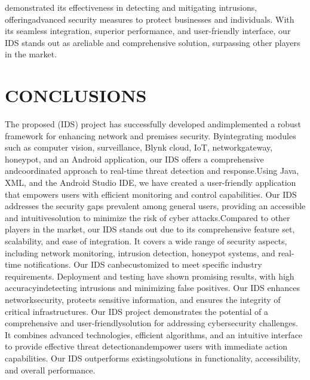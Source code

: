 \documentclass[letterpaper, 10 pt, conference]{ieeeconf}  %
\begin{document}
demonstrated its effectiveness in detecting and mitigating intrusions, offeringadvanced security measures to protect businesses and individuals. With its seamless
integration, superior performance, and user-friendly interface, our IDS stands out as areliable and comprehensive solution, surpassing other players in the market.
\section{CONCLUSIONS}
The proposed (IDS) project has successfully developed andimplemented a robust framework for enhancing network and premises security. Byintegrating modules such as computer vision, surveillance, Blynk cloud, IoT, networkgateway, honeypot, and an Android application, our IDS offers a comprehensive andcoordinated approach to real-time threat detection and response.Using Java, XML, and the Android Studio IDE, we have created a user-friendly application that
empowers users with efficient monitoring and control capabilities. Our IDS addresses
the security gaps prevalent among general users, providing an accessible and intuitivesolution to minimize the risk of cyber attacks.Compared to other players in the market, our IDS stands out due to its comprehensive feature set, scalability, and ease of
integration. It covers a wide range of security aspects, including network monitoring, intrusion detection, honeypot systems, and real-time notifications. Our IDS canbecustomized to meet specific industry requirements. Deployment and testing have shown promising results, with high accuracyindetecting intrusions and minimizing false positives. Our IDS enhances networksecurity, protects sensitive information, and ensures the integrity of critical
infrastructures. Our IDS project demonstrates the potential of a comprehensive and user-friendlysolution for addressing cybersecurity challenges. It combines advanced technologies, efficient algorithms, and an intuitive interface to provide effective threat detectionandempower users with immediate action capabilities. Our IDS outperforms existingsolutions in functionality, accessibility, and overall performance.




\end{document}
